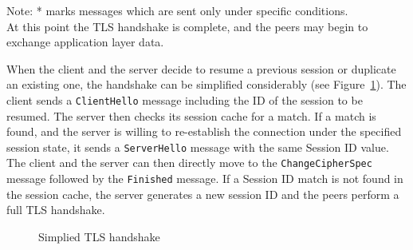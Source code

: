     Note: * marks messages which are sent only under specific conditions. \\

    At this point the TLS handshake is complete, and the peers may begin to
    exchange application layer data.

    When the client and the server decide to resume a previous session or duplicate
    an existing one, the handshake can be simplified considerably
    (see Figure~\ref{fig:simplied_tls_handshake}). The client
    sends a \texttt{ClientHello} message including the ID of the session to be
    resumed. The server then checks its session cache for a match. If a match
    is found, and the server is willing to re-establish the connection under
    the specified session state, it sends a \texttt{ServerHello} message with
    the same Session ID value. The client and the server can then directly move
    to the \texttt{ChangeCipherSpec} message followed by the \texttt{Finished}
    message. If a Session ID match is not found in the session cache, the
    server generates a new session ID and the peers perform a full TLS handshake.

    \begin{figure}[H]
    \centering
    \caption{Simplied TLS handshake} \label{fig:simplied_tls_handshake}
    \end{figure}


